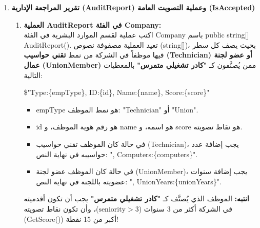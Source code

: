 \documentclass[14pt]{extarticle}
\begin{document}
\begin{enumerate}[resume, label=\textbf{تمرين \arabic*:}, wide=0pt, leftmargin=*, itemsep=2em]
    \item \textbf{تقرير المراجعة الإدارية (\textenglish{AuditReport}) وعملية التصويت العامة (\textenglish{IsAccepted})}
    \begin{enumerate}[label=\textbf{(\arabic*)}]
        \item \textbf{العملية \textenglish{AuditReport} في الفئة \textenglish{Company}:} \\
        اكتب عملية لقسم الموارد البشرية في الفئة \textenglish{Company} باسم \textenglish{public string[] AuditReport()}. تعيد العملية مصفوفة نصوص (\textenglish{string[]})، بحيث يصف كل سطر فيها موظفاً في الشركة من نمط \textbf{تقني حواسيب (\textenglish{Technician}) أو عضو لجنة عمال (\textenglish{UnionMember})} ممن يُصنَّفون كـ \textbf{"كادر تشغيلي متمرس"} بالمعطيات التالية:
        \begin{center}
        \textenglish{\$"Type:\{empType\}, ID:\{id\}, Name:\{name\}, Score:\{score\}"}
        \end{center}
        \begin{itemize}
            \item \textenglish{empType} هو نمط الموظف: \textenglish{"Technician"} أو \textenglish{"Union"}.
            \item \textenglish{id} هو رقم هوية الموظف، و \textenglish{name} هو اسمه، و \textenglish{score} هو نقاط تصويته.
            \item في حالة كان الموظف تقني حواسيب (\textenglish{Technician})، يجب إضافة عدد حواسيبه في نهاية النص: \textenglish{", Computers:\{computers\}"}.
            \item في حالة كان الموظف عضو لجنة (\textenglish{UnionMember})، يجب إضافة سنوات عضويته باللجنة في نهاية النص: \textenglish{", UnionYears:\{unionYears\}"}.
        \end{itemize}
        \textbf{انتبه:} الموظف الذي يُصنَّف كـ \textbf{"كادر تشغيلي متمرس"} يجب أن تكون أقدميته في الشركة أكثر من 3 سنوات ($\text{seniority} > 3$)، وأن تكون نقاط تصويته (\textenglish{GetScore()}) أكبر من 15 نقطة!


\end{enumerate}
\end{enumerate}
\end{document}
